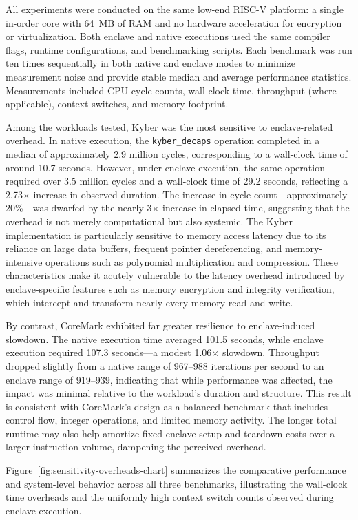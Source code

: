 All experiments were conducted on the same low-end RISC-V platform: a single in-order core with 64~MB of RAM and no hardware acceleration for encryption or virtualization. Both enclave and native executions used the same compiler flags, runtime configurations, and benchmarking scripts. Each benchmark was run ten times sequentially in both native and enclave modes to minimize measurement noise and provide stable median and average performance statistics. Measurements included CPU cycle counts, wall-clock time, throughput (where applicable), context switches, and memory footprint.

Among the workloads tested, Kyber was the most sensitive to enclave-related overhead. In native execution, the \texttt{kyber\_decaps} operation completed in a median of approximately 2.9 million cycles, corresponding to a wall-clock time of around 10.7 seconds. However, under enclave execution, the same operation required over 3.5 million cycles and a wall-clock time of 29.2 seconds, reflecting a 2.73$\times$ increase in observed duration. The increase in cycle count—approximately 20\%—was dwarfed by the nearly 3$\times$ increase in elapsed time, suggesting that the overhead is not merely computational but also systemic. The Kyber implementation is particularly sensitive to memory access latency due to its reliance on large data buffers, frequent pointer dereferencing, and memory-intensive operations such as polynomial multiplication and compression. These characteristics make it acutely vulnerable to the latency overhead introduced by enclave-specific features such as memory encryption and integrity verification, which intercept and transform nearly every memory read and write.

By contrast, CoreMark exhibited far greater resilience to enclave-induced slowdown. The native execution time averaged 101.5 seconds, while enclave execution required 107.3 seconds—a modest 1.06$\times$ slowdown. Throughput dropped slightly from a native range of 967--988 iterations per second to an enclave range of 919--939, indicating that while performance was affected, the impact was minimal relative to the workload's duration and structure. This result is consistent with CoreMark’s design as a balanced benchmark that includes control flow, integer operations, and limited memory activity. The longer total runtime may also help amortize fixed enclave setup and teardown costs over a larger instruction volume, dampening the perceived overhead.

Figure~\ref{fig:sensitivity-overheads-chart} summarizes the comparative performance and system-level behavior across all three benchmarks, illustrating the wall-clock time overheads and the uniformly high context switch counts observed during enclave execution.


